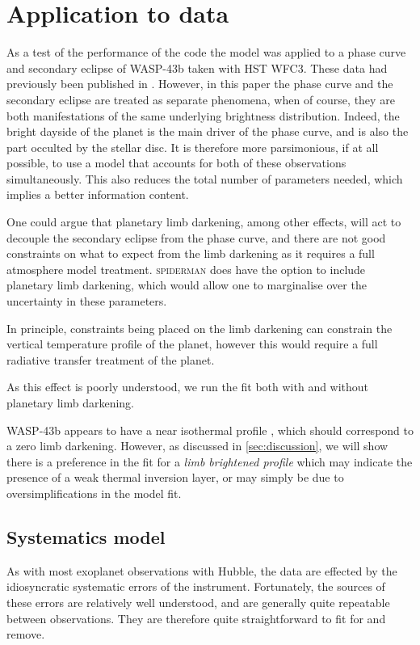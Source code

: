 \documentclass[a4paper,fleqn,usenatbib]{mnras}
\begin{document}
\section{Application to data}\label{sec:Application}

As a test of the performance of the code the model was applied to a phase curve and secondary eclipse of WASP-43b taken with HST WFC3. These data had previously been published in \citet{Stevenson2014}. However, in this paper the phase curve and the secondary eclipse are treated as separate phenomena, when of course, they are both manifestations of the same underlying brightness distribution. Indeed, the bright dayside of the planet is the main driver of the phase curve, and is also the part occulted by the stellar disc. It is therefore more parsimonious, if at all possible, to use a model that accounts for both of these observations simultaneously. This also reduces the total number of parameters needed, which implies a better information content.

One could argue that planetary limb darkening, among other effects, will act to decouple the secondary eclipse from the phase curve, and there are not good constraints on what to expect from the limb darkening as it requires a full atmosphere model treatment. \textsc{spiderman} does have the option to include planetary limb darkening, which would allow one to marginalise over the uncertainty in these parameters. 

In principle, constraints being placed on the limb darkening can constrain the vertical temperature profile of the planet, however this would require a full radiative transfer treatment of the planet.

As this effect is poorly understood, we run the fit both with and without planetary limb darkening.

WASP-43b appears to have a near isothermal profile \citep{Stevenson2014}, which should correspond to a zero limb darkening. However, as discussed in \ref{sec:discussion}, we will show there is a preference in the fit for a \emph{limb brightened profile} which may indicate the presence of a weak thermal inversion layer, or may simply be due to oversimplifications in the model fit.

\subsection{Systematics model}\label{sec:systematics}

As with most exoplanet observations with Hubble, the data are effected by the idiosyncratic systematic errors of the instrument. Fortunately, the sources of these errors are relatively well understood, and are generally quite repeatable between observations. They are therefore quite straightforward to fit for and remove. 
\end{document}
